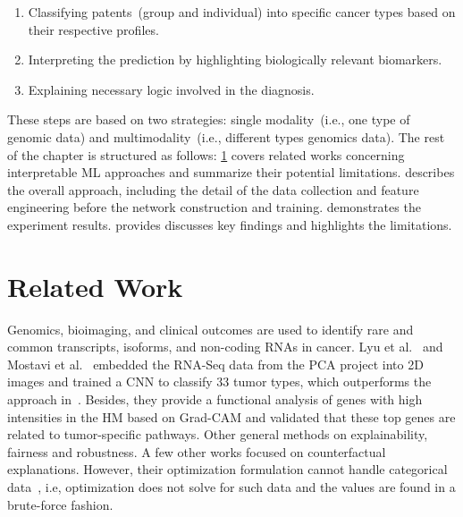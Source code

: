 \begin{enumerate}[noitemsep]
    \item Classifying patents~(group and individual) into specific cancer types based on their respective profiles.
    \item Interpreting the prediction by highlighting biologically relevant biomarkers.
    \item Explaining necessary logic involved in the diagnosis. 
\end{enumerate}

\hspace*{3.5mm} These steps are based on two strategies: single modality~(i.e., one type of genomic data) and multimodality~(i.e., different types genomics data). 
The rest of the chapter is structured as follows: \cref{chapter_5:rw} covers related works concerning interpretable ML approaches and summarize their potential limitations.  describes the overall approach, including the detail of the data collection and feature engineering before the network construction and training.  demonstrates the experiment results.  provides discusses key findings and highlights the limitations. %

\section{Related Work}\label{chapter_5:rw}
Genomics, bioimaging, and clinical outcomes are used to identify rare and common transcripts, isoforms, and non-coding RNAs in cancer. 
Lyu et al.~\cite{lyu2018deep} and Mostavi et al.~\cite{mostavi2019convolutional} embedded the RNA-Seq data from the PCA project into 2D images and trained a CNN to classify 33 tumor types, which outperforms the approach in~\cite{li2017comprehensive}. Besides, they provide a functional analysis of genes with high intensities in the HM based on Grad-CAM and validated that these top genes are related to tumor-specific pathways. Other general methods on explainability, fairness and robustness. 
A few other works focused on counterfactual explanations. However, their optimization formulation cannot handle categorical data~\cite{ying2019gnnexplainer}, i.e, optimization does not solve for such data and the values are found in a brute-force fashion.

